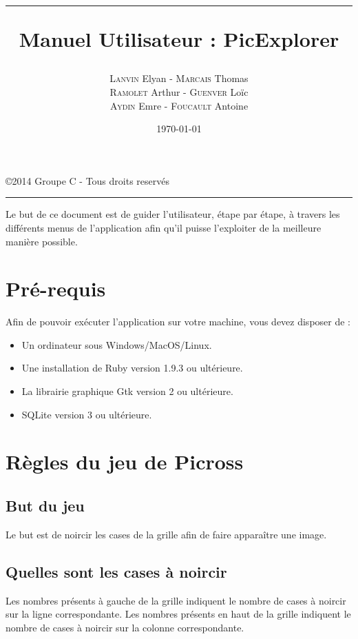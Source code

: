 \documentclass[a4paper, 12pt, twoside]{article}
\title{\hrule \vspace{1cm} Manuel Utilisateur : PicExplorer}
\author{\textsc{Lanvin} Elyan - \textsc{Marcais} Thomas\\ \textsc{Ramolet} Arthur - \textsc{Guenver} Loïc\\ \textsc{Aydin} Emre - \textsc{Foucault} Antoine}
\date{\today}
\begin{document}
\pagestyle{fancy}
\lhead{}
\chead{}
\rhead{\leftmark}
\cfoot{}

\clearpage
\thispagestyle{empty}

\maketitle
\begin{center}
 \copyright 2014 Groupe C - Tous droits reservés\\
\end{center}
\vspace{1cm}
\hrule
\thispagestyle{empty}

\newpage

\renewcommand{\contentsname}{Sommaire}
Le but de ce document est de guider l'utilisateur, étape par étape, à travers les différents menus de l'application afin qu'il puisse l'exploiter de la meilleure manière possible.
\tableofcontents
\newpage

\section{Pré-requis}

Afin de pouvoir exécuter l'application sur votre machine, vous devez disposer de :

\begin{itemize}\setlength{\itemsep}{1mm}
 \item Un ordinateur sous Windows/MacOS/Linux.
 \item Une installation de Ruby version 1.9.3 ou ultérieure.
 \item La librairie graphique Gtk version 2 ou ultérieure.
 \item SQLite version 3 ou ultérieure.
\end{itemize}


\section{Règles du jeu de Picross}

\subsection{But du jeu}
Le but est de noircir les cases de la grille afin de faire apparaître une image.

\subsection{Quelles sont les cases à noircir}
Les nombres présents à gauche de la grille indiquent le nombre de cases à noircir sur la ligne correspondante. 
\smallbreak
Les nombres présents en haut de la grille indiquent le nombre de cases à noircir sur la colonne correspondante.
\end{document}
